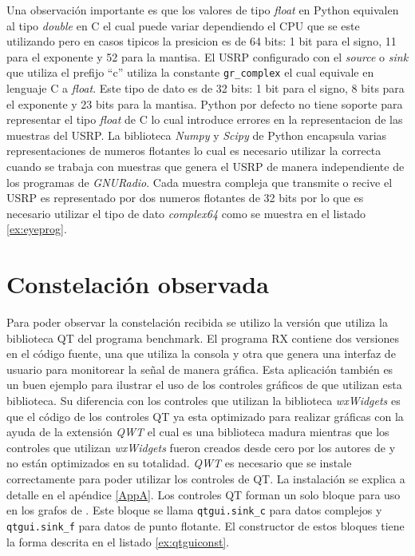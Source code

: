 Una observaci\'on importante es que los valores de tipo \emph{float} en Python equivalen al tipo
\emph{double} en C el cual puede variar dependiendo el CPU que se este utilizando pero en casos
tipicos la presicion es de 64 bits: 1 bit para el signo, 11 para el exponente y 52 para la mantisa.
\cite{python} El USRP configurado con el \emph{source} o \emph{sink} que utiliza el prefijo ``c''
utiliza la constante \verb|gr_complex| el cual equivale en lenguaje C a \emph{float}. Este tipo de
dato es de 32 bits: 1 bit para el signo, 8 bits para el exponente y 23 bits para la mantisa. Python
por defecto no tiene soporte para representar el tipo \emph{float} de C lo cual introduce errores en la
representacion de las muestras del USRP. La biblioteca \emph{Numpy} y \emph{Scipy} de Python encapsula
varias representaciones de numeros flotantes \cite{scipy} lo cual es necesario utilizar la correcta
cuando se trabaja con muestras que genera el USRP de manera independiente de los programas de
\emph{GNURadio}. Cada muestra compleja que transmite o recive el USRP es representado por dos
numeros flotantes de 32 bits por lo que es necesario utilizar el tipo de dato \emph{complex64} como
se muestra en el listado \ref{ex:eyeprog}.

\section{Constelaci\'on observada}

Para poder observar la constelaci\'on recibida se utilizo la versi\'on que utiliza la biblioteca QT
del programa benchmark. El programa RX contiene dos versiones en el c\'odigo fuente, una que utiliza
la consola y otra que genera una interfaz de usuario para monitorear la se\~nal de manera gr\'afica.
Esta aplicaci\'on tambi\'en es un buen ejemplo para ilustrar el uso de los controles gr\'aficos de
\gnuradio que utilizan esta biblioteca. Su diferencia con los controles que utilizan la biblioteca
\emph{wxWidgets} es que el c\'odigo de los controles QT ya esta optimizado para realizar gr\'aficas
con la ayuda de la extensi\'on \emph{QWT} el cual es una biblioteca madura mientras que los
controles que utilizan \emph{wxWidgets} fueron creados desde cero por los autores de \gnuradio y no
est\'an optimizados en su totalidad. \emph{QWT} es necesario que se instale correctamente para poder
utilizar los controles de QT. La instalaci\'on se explica a detalle en el ap\'endice \ref{AppA}. Los
controles QT forman un solo bloque para uso en los grafos de \gnuradio. Este bloque se llama
\verb|qtgui.sink_c| para datos complejos y \verb|qtgui.sink_f| para datos de punto flotante. El
constructor de estos bloques tiene la forma descrita en el listado \ref{ex:qtguiconst}.

